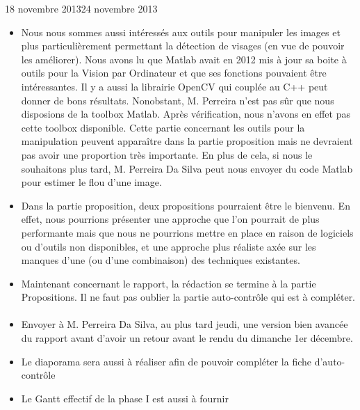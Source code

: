 \documentclass[12pt]{fiche-rd-info}
\begin{document}
\begin{fichesuivi}{18 novembre 2013}{24 novembre 2013}
\begin{echange}
\begin{itemize}
			\item Nous nous sommes aussi intéressés aux outils pour manipuler les images et plus particulièrement permettant la détection de visages (en vue de pouvoir les améliorer). Nous avons lu que Matlab avait en 2012 mis à jour sa boite à outils pour la Vision par Ordinateur et que ses fonctions pouvaient être intéressantes. Il y a aussi la librairie OpenCV qui couplée au C++ peut donner de bons résultats. Nonobstant, M. Perreira n'est pas sûr que nous disposions de la toolbox Matlab. Après vérification, nous n'avons en effet pas cette toolbox disponible. Cette partie concernant les outils pour la manipulation peuvent apparaître dans la partie proposition mais ne devraient pas avoir une proportion très importante. En plus de cela, si nous le souhaitons plus tard, M. Perreira Da Silva peut nous envoyer du code Matlab pour estimer le flou d'une image.
			\item Dans la partie proposition, deux propositions pourraient être le bienvenu. En effet, nous pourrions présenter une approche que l'on pourrait de plus performante mais que nous ne pourrions mettre en place en raison de logiciels ou d'outils non disponibles, et une approche plus réaliste axée sur les manques d'une (ou d'une combinaison) des techniques existantes. 					\item Maintenant concernant le rapport, la rédaction se termine à la partie Propositions. Il ne faut pas oublier la partie auto-contrôle qui est à compléter.
		\end{itemize}
	\end{echange}		
		
\paragraph{}
	\begin{planification}
		\begin{itemize}
			\item Envoyer à M. Perreira Da Silva, au plus tard jeudi, une version bien avancée du rapport avant d'avoir un retour avant le rendu du dimanche 1er décembre.
			\item Le diaporama sera aussi à réaliser afin de pouvoir compléter la fiche d'auto-contrôle
			\item Le Gantt effectif de la phase I est aussi à fournir
		\end{itemize}
	\end{planification}
\end{fichesuivi}
\end{document}
